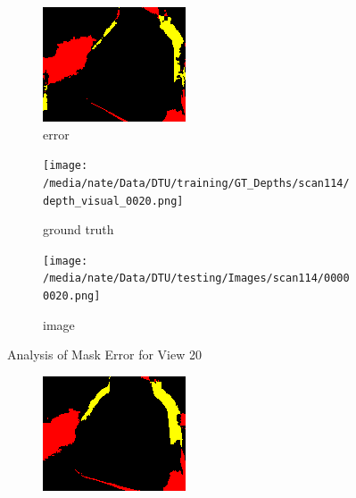 \documentclass{article}
\begin{document}
\begin{figure}
\begin{subfigure}{0.3\textwidth}
		\includegraphics[width=\textwidth]{./output/020_error.png}
		\caption{error}
		\label{fig:error20}
	\end{subfigure}
	\hfill
	\centering
	\begin{subfigure}{0.3\textwidth}
		\centering
		\texttt{[image: /media/nate/Data/DTU/training/GT\_Depths/scan114/depth\_visual\_0020.png]}
		\caption{ground truth}
		\label{fig:gt20}
	\end{subfigure}
	\hfill
	\centering
	\begin{subfigure}{0.3\textwidth}
		\centering
		\texttt{[image: /media/nate/Data/DTU/testing/Images/scan114/00000020.png]}
		\caption{image}
		\label{fig:img20}
	\end{subfigure}
	\hfill
	\caption{Analysis of Mask Error for View 20}
	\label{fig:error_analys20}
\end{figure}\begin{figure}
	\centering
	\begin{subfigure}{0.3\textwidth}
		\centering
		\includegraphics[width=\textwidth]{./output/021_error.png}

\end{subfigure}
\end{figure}
\end{document}
